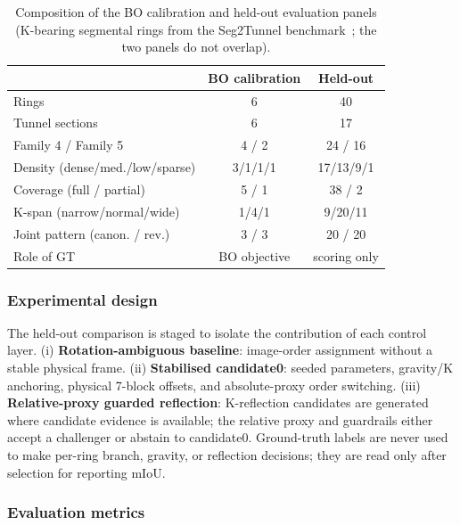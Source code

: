 \documentclass[a4paper,fleqn]{cas-dc}
\begin{document}
\begin{table}[!t]
\caption{Composition of the BO calibration and held-out evaluation panels (K-bearing segmental rings from the Seg2Tunnel benchmark~\cite{ye2025sam4tun}; the two panels do not overlap).}
\label{tab:datasets}
\centering
\small
\begin{tabular}{lcc}
\toprule
 & BO calibration & Held-out \\
\midrule
Rings                              & 6        & 40        \\
Tunnel sections                    & 6        & 17        \\
Family 4 / Family 5                & 4 / 2    & 24 / 16   \\
Density (dense/med./low/sparse)    & 3/1/1/1  & 17/13/9/1 \\
Coverage (full / partial)          & 5 / 1    & 38 / 2    \\
K-span (narrow/normal/wide)        & 1/4/1    & 9/20/11   \\
Joint pattern (canon. / rev.)      & 3 / 3    & 20 / 20   \\
Role of GT                         & BO objective & scoring only \\
\bottomrule
\end{tabular}
\end{table}


\subsubsection{Experimental design}\label{sec:comparators}

The held-out comparison is staged to isolate the contribution of each control layer. (i) \textbf{Rotation-ambiguous baseline}: image-order assignment without a stable physical frame. (ii) \textbf{Stabilised candidate0}: seeded parameters, gravity/K anchoring, physical 7-block offsets, and absolute-proxy order switching. (iii) \textbf{Relative-proxy guarded reflection}: K-reflection candidates are generated where candidate evidence is available; the relative proxy and guardrails either accept a challenger or abstain to candidate0. Ground-truth labels are never used to make per-ring branch, gravity, or reflection decisions; they are read only after selection for reporting mIoU.

\subsubsection{Evaluation metrics}\label{sec:metrics}
\end{document}
